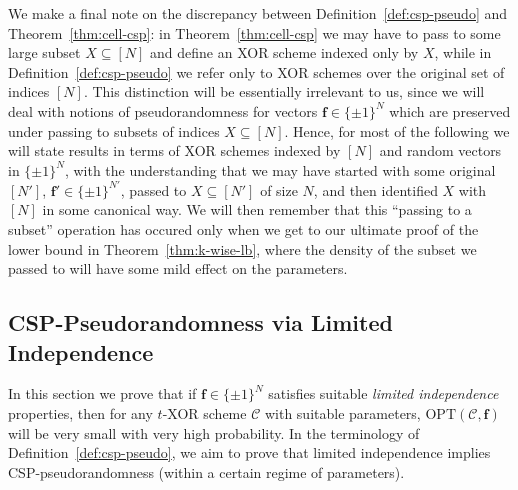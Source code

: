 \documentclass[11pt]{article}
\newcommand{\Opt}{\mathrm{OPT}}
\newcommand{\N}{[N]}
\begin{document}
We make a final note on the discrepancy between Definition~\ref{def:csp-pseudo} and Theorem~\ref{thm:cell-csp}: in Theorem~\ref{thm:cell-csp} we may have to pass to some large subset $X \subseteq \N$ and define an XOR scheme indexed only by $X$, while in Definition~\ref{def:csp-pseudo} we refer only to XOR schemes over the original set of indices $\N$. This distinction will be essentially irrelevant to us, since we will deal with notions of pseudorandomness for vectors $\bm{f} \in \{\pm 1\}^N$ which are preserved under passing to subsets of indices $X \subseteq \N$. Hence, for most of the following we will state results in terms of XOR schemes indexed by $\N$ and random vectors in $\{\pm 1\}^N$, with the understanding that we may have started with some original $[N']$, $\bm{f}' \in \{\pm 1\}^{N'}$, passed to $X \subseteq [N']$ of size $N$, and then identified $X$ with $[N]$ in some canonical way. We will then remember that this ``passing to a subset'' operation has occured only when we get to our ultimate proof of the lower bound in Theorem~\ref{thm:k-wise-lb}, where the density of the subset we passed to will have some mild effect on the parameters.

\subsection{CSP-Pseudorandomness via Limited Independence}\label{subsec:k-wise-lbs}
In this section we prove that if $\bm{f} \in \{\pm 1\}^N$ satisfies suitable \emph{limited independence} properties, then for any $t$-XOR scheme $\mathcal{C}$ with suitable parameters, $\Opt(\mathcal{C},\bm{f})$ will be very small with very high probability.
In the terminology of Definition~\ref{def:csp-pseudo}, we aim to prove that limited independence implies CSP-pseudorandomness (within a certain regime of parameters). 
\end{document}
